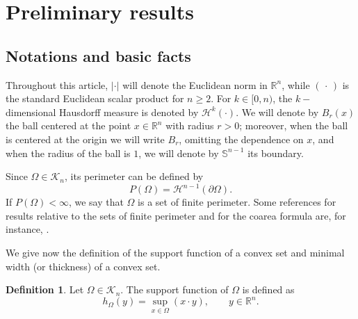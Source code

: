 \documentclass[oneside,a4paper,11pt,notitlepage]{article}
\makeatletter
\theoremstyle{definition}
\newtheorem{definizione}{Definition}[section]
\theoremstyle{plain}
\theoremstyle{definition}
\newcommand{\Addresses}{{%
  \bigskip 
   \footnotesize 
 \noindent \textit{E-mail address}, V.~ Amato: \texttt{v.amato@ssmeridionale.it} 
  
   \medskip 
 
  \noindent\textsc{Mathematical and Physical Sciences for Advanced Materials and Technologies, Scuola Superiore Meridionale, Largo San Marcellino 10, 80138 Napoli, Italy. } 
 
 
 \medskip 
 

   \textit{E-mail address}, N.~Gavitone: \texttt{nunzia.gavitone@unina.it} 
   
 \medskip
  \textsc{Dipartimento di Matematica e Applicazioni ``R. Caccioppoli'', Universit\`a degli studi di Napoli Federico II, Via Cintia, Complesso Universitario Monte S. Angelo, 80126 Napoli, Italy.}
  \medskip
 
  \textit{E-mail address}, R.~Sannipoli: \texttt{rossano.sannipoli@unipd.it} 
  
     \medskip 
\textsc{Dipartimento di Matematica “Tullio Levi-Civita”, Universit\'a degli Studi di Padova, Via Trieste 63, 35131 Padua, Italy.}\par\nopagebreak 

}}
\makeatother
\begin{document}
  
  
  

\section{Preliminary results}\label{sec:2}
\label{section_notion}
\subsection{Notations and basic facts} 
 Throughout this article, $|\cdot|$ will denote the Euclidean norm in $\mathbb{R}^n$,
 while $(\,\cdot\,)$ is the standard Euclidean scalar product for  $n\geq2$. For $k\in [0,n)$, the $k-$dimensional Hausdorff measure is denoted by $\mathcal{H}^k(\cdot)$. We will denote by $B_r(x)$ the ball centered at the point $x\in \mathbb R^n$ with radius $r>0$; moreover, when the ball is centered at the origin we will write $B_r$, omitting the dependence on $x$, and when the radius of the ball is $1$, we will denote by $\mathbb{S}^{n-1}$ its boundary.
 
Since $\Omega \in \mathcal{K}_n$, its perimeter can be defined by
\[
P(\Omega) = \mathcal{H}^{n-1}(\partial \Omega).
\]
If $P(\Omega) < \infty$, we say that $\Omega$ is a set of finite perimeter. Some references for results relative to the sets of finite perimeter and for the coarea formula are, for instance, \cite{ambrosio2000functions,maggi2012sets}.

 
 We give now the definition of the support function of a convex set and minimal width (or thickness) of a convex set.
\begin{definizione}\label{support}
  Let $\Omega\in \mathcal{K}_n$. The support function of $\Omega$ is defined as
  \begin{equation*}
    h_\Omega(y)=\sup_{x\in \Omega}\left(x\cdot y\right), \qquad y\in \mathbb{R}^n .
  \end{equation*}
\end{definizione}
 
\end{document}
